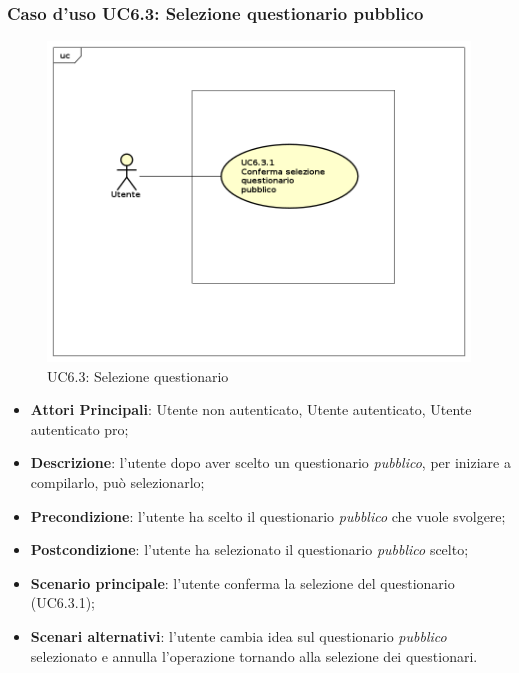 \subsubsection{Caso d'uso UC6.3: Selezione questionario pubblico}
\label{UC6.3}
\begin{figure}[h]
\centering
\includegraphics[scale=0.5,keepaspectratio]{UML/UC6_3.png}
\caption{UC6.3: Selezione questionario}
\end{figure}
\FloatBarrier
\begin{itemize}
\item\textbf{Attori Principali}: Utente non autenticato, Utente autenticato, Utente autenticato pro;
\item\textbf{Descrizione}: l'utente dopo aver scelto un questionario \textit{pubblico}, per iniziare a compilarlo, può selezionarlo;
\item\textbf{Precondizione}: l'utente ha scelto il questionario \textit{pubblico} che vuole svolgere;
\item\textbf{Postcondizione}: l'utente ha selezionato il questionario \textit{pubblico} scelto;
\item\textbf{Scenario principale}: l'utente conferma la selezione del questionario (UC6.3.1);
\item\textbf{Scenari alternativi}: l'utente cambia idea sul questionario \textit{pubblico} selezionato e annulla l'operazione tornando alla selezione dei questionari.
\end{itemize}

